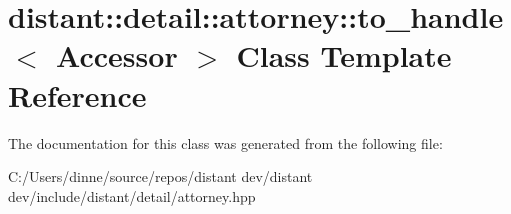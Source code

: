 \hypertarget{classdistant_1_1detail_1_1attorney_1_1to__handle}{}\section{distant\+:\+:detail\+:\+:attorney\+:\+:to\+\_\+handle$<$ Accessor $>$ Class Template Reference}
\label{classdistant_1_1detail_1_1attorney_1_1to__handle}


The documentation for this class was generated from the following file\+:\begin{DoxyCompactItemize}
\item 
C\+:/\+Users/dinne/source/repos/distant dev/distant dev/include/distant/detail/attorney.\+hpp\end{DoxyCompactItemize}
